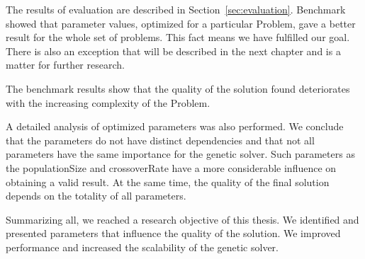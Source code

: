 The results of evaluation are described in Section~\ref{sec:evaluation}.
Benchmark showed that parameter values, optimized for a particular Problem, gave a better result for the whole set of problems. This fact means we have fulfilled our goal. There is also an exception that will be described in the next chapter and is a matter for further research.

The benchmark results show that the quality of the solution found deteriorates with the increasing complexity of the Problem.

A detailed analysis of optimized parameters was also performed. We conclude that the parameters do not have distinct dependencies and that not all parameters have the same importance for the genetic solver. Such parameters as the populationSize and crossoverRate have a more considerable influence on obtaining a valid result. At the same time, the quality of the final solution depends on the totality of all parameters.

Summarizing all, we reached a research objective of this thesis. We identified and presented parameters that influence the quality of the solution. We improved performance and increased the scalability of the genetic solver.
